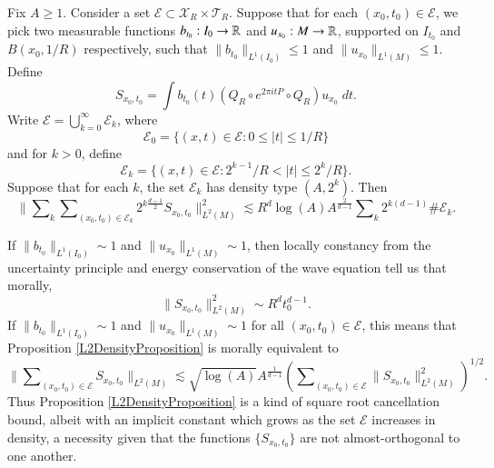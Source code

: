 \begin{prop} \label{L2DensityProposition}
    Fix $A \geq 1$. Consider a set $\mathcal{E} \subset \mathcal{X}_R \times \mathcal{T}_R$. Suppose that for each $(x_0,t_0) \in \mathcal{E}$, we pick two measurable functions $b_{t_0}: I_0 \to \operatorname{\mathbb{R}}$ and $u_{x_0}: M \to \operatorname{\mathbb{R}}$, supported on $I_{t_0}$ and $B(x_0,1/R)$ respectively, such that $\| b_{t_0} \|_{L^1(I_0)} \leq 1$ and $\| u_{x_0} \|_{L^1(M)} \leq 1$. Define 
    \[ {S\!}_{x_0,t_0} = \int b_{t_0}(t) (Q_R \circ e^{2 \pi i t P} \circ Q_R) u_{x_0}\; dt. \]
    Write $\mathcal{E} = \bigcup_{k = 0}^\infty \mathcal{E}_k$, where
    \[ \mathcal{E}_0 = \{ (x,t) \in \mathcal{E}: 0 \leq |t| \leq 1/R \} \]
    and for $k > 0$, define
    \[ \mathcal{E}_k = \{ (x,t) \in \mathcal{E}: 2^{k-1} / R < |t| \leq 2^k / R \}. \]
    Suppose that for each $k$, the set $\mathcal{E}_k$ has density type $(A,2^{k})$.
    Then
    \[ \Big\| \sum\nolimits_k \sum\nolimits_{(x_0,t_0) \in \mathcal{E}_k} 2^{k \frac{d-1}{2}} {S\!}_{x_0,t_0} \Big\|_{L^2(M)}^2 \lesssim R^d \log(A) A^{\frac{2}{d-1}} \sum\nolimits_k 2^{k(d-1)} \# \mathcal{E}_k. \]
\end{prop}

\begin{remark}
    If $\| b_{t_0} \|_{L^1(I_0)} \sim 1$ and $\| u_{x_0} \|_{L^1(M)} \sim 1$, then locally constancy from the uncertainty principle and energy conservation of the wave equation tell us that morally,
    \begin{equation}
        \| S_{x_0,t_0} \|_{L^2(M)}^2 \sim R^d t_0^{d-1}.
    \end{equation}
    If $\| b_{t_0} \|_{L^1(I_0)} \sim 1$ and $\| u_{x_0} \|_{L^1(M)} \sim 1$ for all $(x_0,t_0) \in \mathcal{E}$, this means that Proposition \ref{L2DensityProposition} is morally equivalent to
    \begin{equation}
        \Big\| \sum\nolimits_{(x_0,t_0) \in \mathcal{E}} {S\!}_{x_0,t_0} \Big\|_{L^2(M)} \lesssim \sqrt{\log(A)} A^{\frac{1}{d-1}} \left( \sum\nolimits_{(x_0,t_0) \in \mathcal{E}} \| {S\!}_{x_0,t_0} \|_{L^2(M)}^2 \right)^{1/2}.
    \end{equation}
    Thus Proposition \ref{L2DensityProposition} is a kind of square root cancellation bound, albeit with an implicit constant which grows as the set $\mathcal{E}$ increases in density, a necessity given that the functions $\{ {S\!}_{x_0,t_0} \}$ are not almost-orthogonal to one another.
\end{remark}

